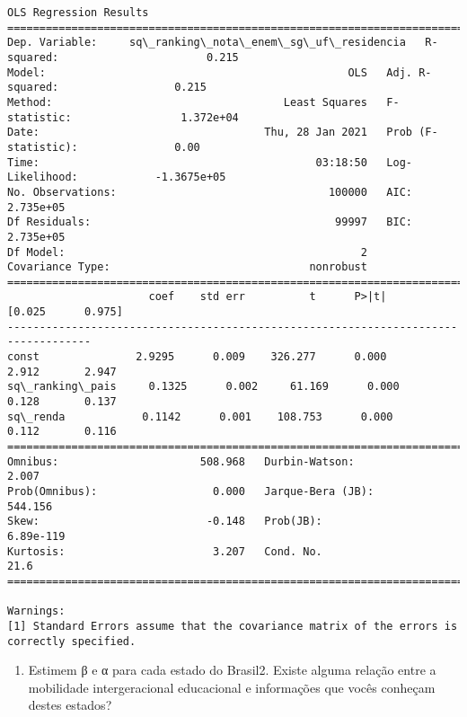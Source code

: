 \documentclass[11pt]{article}
\providecommand{\tightlist}{%
      \setlength{\itemsep}{0pt}\setlength{\parskip}{0pt}}
\begin{document}
    \begin{Verbatim}[commandchars=\\\{\}]
                                      OLS Regression Results                                     
=================================================================================================
Dep. Variable:     sq\_ranking\_nota\_enem\_sg\_uf\_residencia   R-squared:                       0.215
Model:                                               OLS   Adj. R-squared:                  0.215
Method:                                    Least Squares   F-statistic:                 1.372e+04
Date:                                   Thu, 28 Jan 2021   Prob (F-statistic):               0.00
Time:                                           03:18:50   Log-Likelihood:            -1.3675e+05
No. Observations:                                 100000   AIC:                         2.735e+05
Df Residuals:                                      99997   BIC:                         2.735e+05
Df Model:                                              2                                         
Covariance Type:                               nonrobust                                         
===================================================================================
                      coef    std err          t      P>|t|      [0.025      0.975]
-----------------------------------------------------------------------------------
const               2.9295      0.009    326.277      0.000       2.912       2.947
sq\_ranking\_pais     0.1325      0.002     61.169      0.000       0.128       0.137
sq\_renda            0.1142      0.001    108.753      0.000       0.112       0.116
==============================================================================
Omnibus:                      508.968   Durbin-Watson:                   2.007
Prob(Omnibus):                  0.000   Jarque-Bera (JB):              544.156
Skew:                          -0.148   Prob(JB):                    6.89e-119
Kurtosis:                       3.207   Cond. No.                         21.6
==============================================================================

Warnings:
[1] Standard Errors assume that the covariance matrix of the errors is correctly specified.

    \end{Verbatim}

    \begin{enumerate}
\def\labelenumi{\arabic{enumi}.}
\setcounter{enumi}{5}
\tightlist
\item
  Estimem β e α para cada estado do Brasil2. Existe alguma relação entre
  a mobilidade intergeracional educacional e informações que vocês
  conheçam destes estados?
\end{enumerate}
\end{document}
